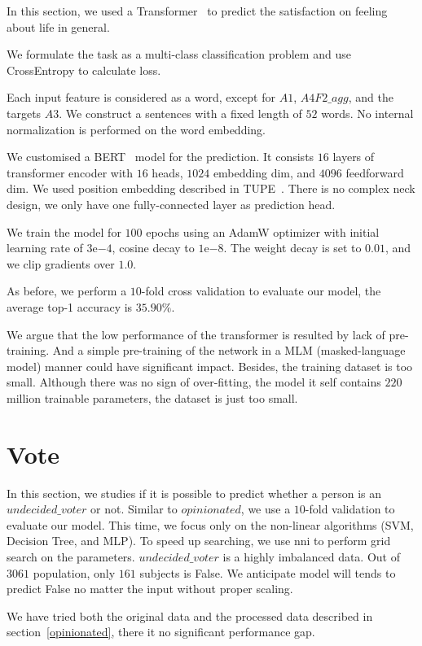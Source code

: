 \documentclass[11pt,twocolumn,letterpaper]{article}
\begin{document}
In this section, we used a Transformer~\cite{transformer} to predict the satisfaction on feeling about life in general.

We formulate the task as a multi-class classification problem and use CrossEntropy to calculate loss.

Each input feature is considered as a word, except for $A1$, $A4F2\_agg$, and the targets $A3$.
We construct a sentences with a fixed length of $52$ words.
No internal normalization is performed on the word embedding.

We customised a BERT~\cite{bert} model for the prediction.
It consists $16$ layers of transformer encoder with $16$ heads, $1024$ embedding dim, and $4096$ feedforward dim.
We used position embedding described in TUPE~\cite{tupe}.
There is no complex neck design, we only have one fully-connected layer as prediction head.

We train the model for $100$ epochs using an AdamW optimizer with initial learning rate of $3\mathrm{e}{-4}$, cosine decay to $1\mathrm{e}{-8}$.
The weight decay is set to $0.01$, and we clip gradients over $1.0$.

As before, we perform a $10$-fold cross validation to evaluate our model, the average top-1 accuracy is $35.90\%$.

We argue that the low performance of the transformer is resulted by lack of pre-training.
And a simple pre-training of the network in a MLM (masked-language model) manner could have significant impact.
Besides, the training dataset is too small.
Although there was no sign of over-fitting, the model it self contains $220$ million trainable parameters, the dataset is just too small.

\section{Vote}\label{vote}

In this section, we studies if it is possible to predict whether a person is an $undecided\_voter$ or not.
Similar to $opinionated$, we use a $10$-fold validation to evaluate our model.
This time, we focus only on the non-linear algorithms (SVM, Decision Tree, and MLP).
To speed up searching, we use nni to perform grid search on the parameters.
$undecided\_voter$ is a highly imbalanced data.
Out of $3061$ population, only $161$ subjects is False.
We anticipate model will tends to predict False no matter the input without proper scaling.

We have tried both the original data and the processed data described in section~\ref{opinionated}, there it no significant performance gap.
\end{document}
